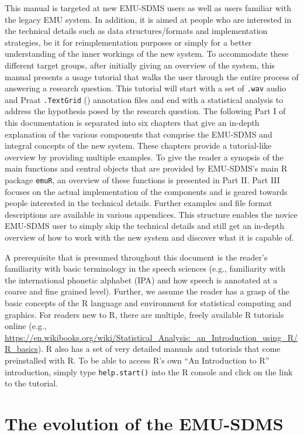 \documentclass[]{book}
\begin{document}
This manual is targeted at new EMU-SDMS users as well as users familiar with the legacy EMU system. In addition, it is aimed at people who are interested in the technical details such as data structures/formats and implementation strategies, be it for reimplementation purposes or simply for a better understanding of the inner workings of the new system. To accommodate these different target groups, after initially giving an overview of the system, this manual presents a usage tutorial that walks the user through the entire process of answering a research question. This tutorial will start with a set of \texttt{.wav} audio and Praat \texttt{.TextGrid} (\citet{boersma:2011a}) annotation files and end with a statistical analysis to address the hypothesis posed by the research question. The following Part I of this documentation is separated into six chapters that give an in-depth explanation of the various components that comprise the EMU-SDMS and integral concepts of the new system. These chapters provide a tutorial-like overview by providing multiple examples. To give the reader a synopsis of the main functions and central objects that are provided by EMU-SDMS's main R package \texttt{emuR}, an overview of these functions is presented in Part II. Part III focuses on the actual implementation of the components and is geared towards people interested in the technical details. Further examples and file format descriptions are available in various appendices. This structure enables the novice EMU-SDMS user to simply skip the technical details and still get an in-depth overview of how to work with the new system and discover what it is capable of.

A prerequisite that is presumed throughout this document is the reader's familiarity with basic terminology in the speech sciences (e.g., familiarity with the international phonetic alphabet (IPA) and how speech is annotated at a coarse and fine grained level). Further, we assume the reader has a grasp of the basic concepts of the R language and environment for statistical computing and graphics. For readers new to R, there are multiple, freely available R tutorials online (e.g., \url{https://en.wikibooks.org/wiki/Statistical_Analysis:_an_Introduction_using_R/R_basics}). R also has a set of very detailed manuals and tutorials that come preinstalled with R. To be able to access R's own ``An Introduction to R'' introduction, simply type \texttt{help.start()} into the R console and click on the link to the tutorial.

\hypertarget{the-evolution-of-the-emu-sdms}{%
\section{The evolution of the EMU-SDMS}\label{the-evolution-of-the-emu-sdms}}
\end{document}
